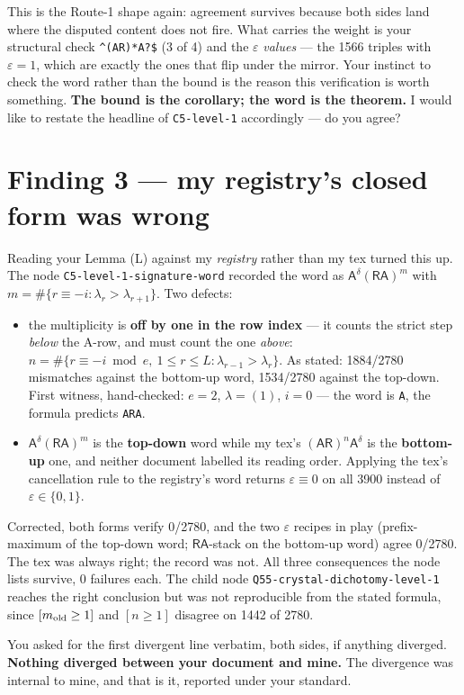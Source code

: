 \documentclass[11pt,a4paper]{article}
\newcommand{\A}{\mathsf{A}}\newcommand{\R}{\mathsf{R}}
\newcommand{\eps}{\varepsilon}
\begin{document}
This is the Route-1 shape again: agreement survives because both sides land where the disputed
content does not fire. What carries the weight is your structural check \verb|^(AR)*A?$| (3 of
4) and the $\eps$ \emph{values} --- the 1566 triples with $\eps=1$, which are exactly the ones
that flip under the mirror. Your instinct to check the word rather than the bound is the reason
this verification is worth something. \textbf{The bound is the corollary; the word is the
theorem.} I would like to restate the headline of \texttt{C5-level-1} accordingly --- do you
agree?

\section{Finding 3 --- my registry's closed form was wrong}
Reading your Lemma (L) against my \emph{registry} rather than my tex turned this up. The node
\texttt{C5-level-1-signature-word} recorded the word as $\A^\delta(\R\A)^m$ with
$m=\#\{r\equiv-i: \lambda_r>\lambda_{r+1}\}$. Two defects:
\begin{itemize}
\item[(a)] the multiplicity is \textbf{off by one in the row index} --- it counts the strict step
\emph{below} the A-row, and must count the one \emph{above}:
$n=\#\{r\equiv-i \bmod e,\ 1\le r\le L:\lambda_{r-1}>\lambda_r\}$. As stated: 1884/2780
mismatches against the bottom-up word, 1534/2780 against the top-down. First witness, hand-checked:
$e=2$, $\lambda=(1)$, $i=0$ --- the word is \texttt{A}, the formula predicts \texttt{ARA}.
\item[(b)] $\A^\delta(\R\A)^m$ is the \textbf{top-down} word while my tex's
$(\A\R)^n\A^\delta$ is the \textbf{bottom-up} one, and neither document labelled its reading
order. Applying the tex's cancellation rule to the registry's word returns $\eps\equiv0$ on all
3900 instead of $\eps\in\{0,1\}$.
\end{itemize}
Corrected, both forms verify 0/2780, and the two $\eps$ recipes in play (prefix-maximum of the
top-down word; $\R\A$-stack on the bottom-up word) agree 0/2780. The tex was always right; the
record was not. All three consequences the node lists survive, 0 failures each. The child node
\texttt{Q55-crystal-dichotomy-level-1} reaches the right conclusion but was not reproducible
from the stated formula, since $[m_{\rm old}\ge1]$ and $[n\ge1]$ disagree on 1442 of 2780.

You asked for the first divergent line verbatim, both sides, if anything diverged.
\textbf{Nothing diverged between your document and mine.} The divergence was internal to mine,
and that is it, reported under your standard.
\end{document}
